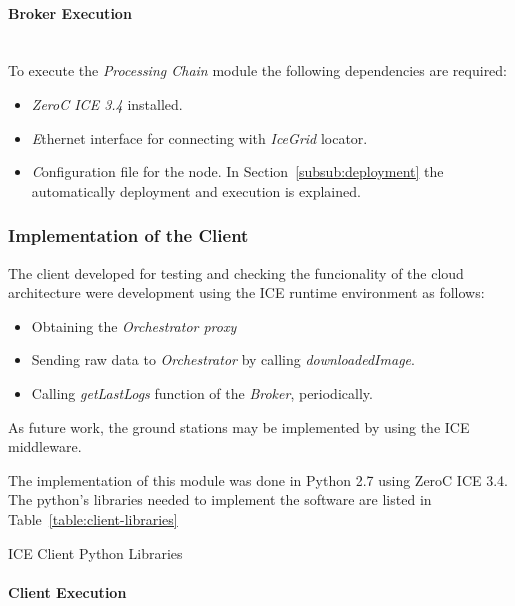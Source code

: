 \paragraph{Broker Execution}~\\

To execute the \emph{Processing Chain} module the following dependencies
are required:
\begin{itemize}
\item \emph{ZeroC ICE 3.4} installed.
\item \emph Ethernet interface for connecting with \emph{IceGrid} locator.
\item \emph Configuration file for the node. In Section~\ref{subsub:deployment} the
  automatically deployment and execution is explained. 
\end{itemize}


\subsubsection{Implementation of the Client}

The client developed for testing and checking the funcionality of the cloud
architecture were development using the ICE runtime environment as follows:
\begin{itemize}
\item Obtaining the \emph{Orchestrator proxy}
\item Sending raw data to  \emph{Orchestrator} by calling \emph{downloadedImage}.
\item Calling \emph{getLastLogs} function of the \emph{Broker}, periodically.
\end{itemize}

As future work, the ground stations may be implemented by using the ICE
middleware.

The implementation of this module was done in Python 2.7 using ZeroC ICE 3.4. The
python's libraries needed to implement the software are listed in
Table~\ref{table:client-libraries}

\begin{table}[hp]
  \centering
  {\small
  
  }
  \caption{ICE Client Python Libraries}
  \label{table:client-libraries}
\end{table}

\paragraph{Client Execution}~\\

